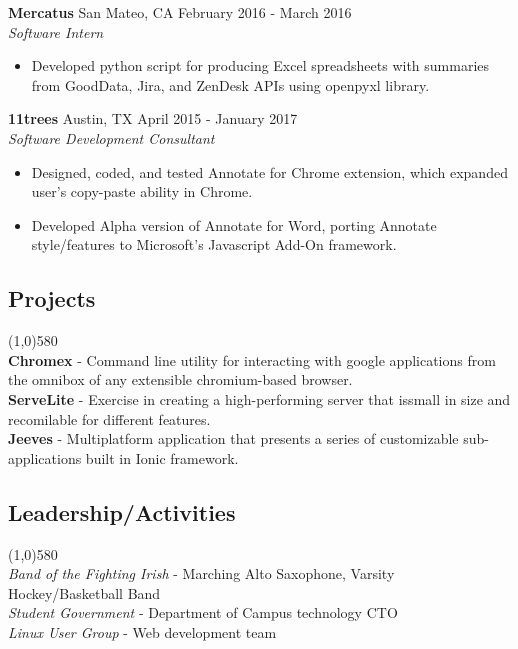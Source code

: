 \documentclass[9pt]{article}
\begin{document}
    \textbf{Mercatus}
    \tab
    San Mateo, CA
    \hfill
    February 2016 - March 2016
    \\
    \textit{Software Intern}
    \begin{itemize}
      \item Developed python script for producing Excel spreadsheets with summaries from GoodData, Jira, and ZenDesk APIs using openpyxl library.
    \end{itemize}
    
    \textbf{11trees}
    \tab
    Austin, TX
    \hfill
    April 2015 - January 2017
    \\
    \textit{Software Development Consultant}
    \begin{itemize}
      \item Designed, coded, and tested Annotate for Chrome extension, which expanded user's copy-paste ability in Chrome.
      \item Developed Alpha version of Annotate for Word, porting Annotate style/features to Microsoft's Javascript Add-On framework.
    \end{itemize}
 

  \vspace{-16pt}
  \subsection*{Projects}
    \vspace{-16pt}
    \line(1,0){580}\\
    \textbf{Chromex} - Command line utility for interacting with google applications from the omnibox of any extensible chromium-based browser.
    \\
    \textbf{ServeLite} - Exercise in creating a high-performing server that issmall in size and recomilable for different features.
    \\
    \textbf{Jeeves} - Multiplatform application that presents a series of customizable sub-applications built in Ionic framework.

  \vspace{-16pt}
  \subsection*{Leadership/Activities}
    \vspace{-16pt}
    \line(1,0){580}\\
    \textit{Band of the Fighting Irish}
    -
    Marching Alto Saxophone, Varsity Hockey/Basketball Band
    \\
    \textit{Student Government}
    -
    Department of Campus technology CTO
    \\
    \textit{Linux User Group}
    -
    Web development team
    
\end{document}
